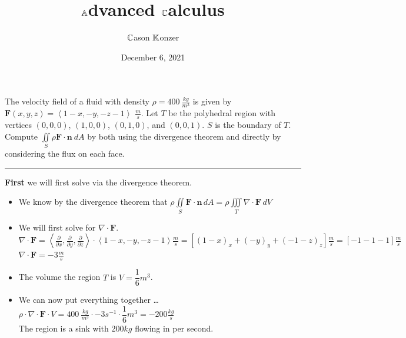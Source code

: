\documentclass[10pt]{article}
\title{$\mathbb{A}$dvanced $\mathbb{C}$alculus}
\author{$\mathbb{C}$ason $\mathbb{K}$onzer}
\date{December 6, 2021}
\begin{document}
\maketitle

\newpage


\section{\underline{}}
\label{sec: Problem 1}

\noindent
The velocity field of a fluid with density $ \rho = 400\ \tfrac{kg}{m^3} $ 
is given by $ \textbf{F}(x,y,z) = \left<1-x,-y,-z-1\right> $ $ \tfrac{m}{s} $. 
Let $ T $ be the polyhedral region with vertices 
$ (0,0,0) $, $ (1,0,0) $, $ (0,1,0) $, and $ (0,0,1) $.  $ S $ is the boundary of $ T $. \\ 
Compute $ \displaystyle \iint \limits_{S} \rho \textbf{F} \cdot \textbf{n}\ dA $ 
by both using the divergence theorem and directly by considering the flux on each face. \\
\vspace{2.5mm}

\hrule 

\vspace{7.5mm}

\noindent
\textbf{First} we will first solve via the divergence theorem. \\

\begin{itemize}
    \item We know by the divergence theorem that 
    $ \displaystyle \rho \iint \limits_{S} \textbf{F} \cdot \textbf{n} \, dA = \rho \iiint \limits_{T} \nabla \cdot \textbf{F} \, dV $ \\
    \item We will first solve for $ \nabla \cdot \textbf{F} $. \\
    \subitem $ \displaystyle \nabla \cdot \textbf{F} = \left<\frac{\partial}{\partial x},\frac{\partial}{\partial y},\frac{\partial}{\partial z}\right> \cdot \left<1-x,-y,-z-1\right> \tfrac{m}{s}= [(1-x)_{x} + (-y)_{y} + (-1-z)_{z}] \tfrac{m}{s} = [-1 -1 -1] \tfrac{m}{s} $ \\
    \subitem $ \displaystyle \nabla \cdot \textbf{F} = -3 \tfrac{m}{s} $ \\
    \item The volume the region $ T $ is $ \displaystyle V = \dfrac{1}{6}m^3 $. \\
    \item We can now put everything together \dots \\
    \subitem $ \displaystyle \rho \cdot \nabla \cdot \textbf{F} \cdot V = 400\ \tfrac{kg}{m^3} \cdot - 3s^{-1} \cdot \dfrac{1}{6}m^3 = -200\tfrac{kg}{s}  $ \\
    \subitem The region is a sink with $ 200kg $ flowing in per second.
\end{itemize}
\end{document}
